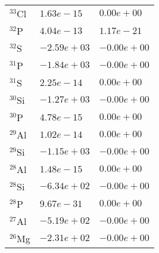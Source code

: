 \begin{tabular}{lll}
 $^{33}$Cl & $1.63e-15 $                                                        & $0.00e+00 $                                                           \\
 $^{32}$P  & $4.04e-13 $                                                        & $1.17e-21 $                                                           \\
 $^{32}$S  & $-2.59e+03 $                                                       & $-0.00e+00 $                                                          \\
 $^{31}$P  & $-1.84e+03 $                                                       & $-0.00e+00 $                                                          \\
 $^{31}$S  & $2.25e-14 $                                                        & $0.00e+00 $                                                           \\
 $^{30}$Si & $-1.27e+03 $                                                       & $-0.00e+00 $                                                          \\
 $^{30}$P  & $4.78e-15 $                                                        & $0.00e+00 $                                                           \\
 $^{29}$Al & $1.02e-14 $                                                        & $0.00e+00 $                                                           \\
 $^{29}$Si & $-1.15e+03 $                                                       & $-0.00e+00 $                                                          \\
 $^{28}$Al & $1.48e-15 $                                                        & $0.00e+00 $                                                           \\
 $^{28}$Si & $-6.34e+02 $                                                       & $-0.00e+00 $                                                          \\
 $^{28}$P  & $9.67e-31 $                                                        & $0.00e+00 $                                                           \\
 $^{27}$Al & $-5.19e+02 $                                                       & $-0.00e+00 $                                                          \\
 $^{26}$Mg & $-2.31e+02 $                                                       & $-0.00e+00 $                                                          \\

\end{tabular}
